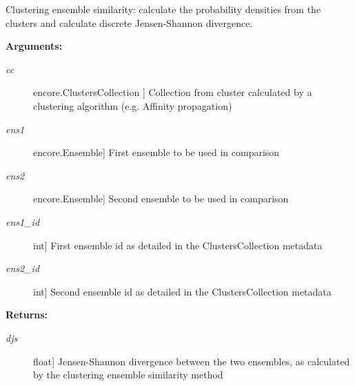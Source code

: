 \documentclass[letterpaper,10pt,english]{sphinxmanual}
\begin{document}

\begin{fulllineitems}
\label{index:encore.similarity.clustering_ensemble_similarity}
Clustering ensemble similarity: calculate the probability densities from the clusters and calculate discrete Jensen-Shannon divergence.

\textbf{Arguments:}
\begin{description}
\item[{\emph{cc}}] \leavevmode{[}encore.ClustersCollection {]}
Collection from cluster calculated by a clustering algorithm (e.g. Affinity propagation)

\item[{\emph{ens1}}] \leavevmode{[}encore.Ensemble{]}
First ensemble to be used in comparison

\item[{\emph{ens2}}] \leavevmode{[}encore.Ensemble{]}
Second ensemble to be used in comparison

\item[{\emph{ens1\_id}}] \leavevmode{[}int{]}
First ensemble id as detailed in the ClustersCollection metadata

\item[{\emph{ens2\_id}}] \leavevmode{[}int{]}
Second ensemble id as detailed in the ClustersCollection metadata

\end{description}

\textbf{Returns:}
\begin{description}
\item[{\emph{djs}}] \leavevmode{[}float{]}
Jensen-Shannon divergence between the two ensembles, as calculated by the clustering ensemble similarity method

\end{description}

\end{fulllineitems}

\end{document}
